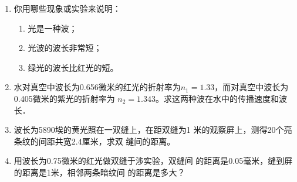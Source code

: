 \begin{enumerate}
    \item 你用哪些现象或实验来说明：
    \begin{enumerate}
        \item 光是一种波；
        \item 光波的波长非常短；
        \item 绿光的波长比红光的短。
    \end{enumerate}
    \item 水对真空中波长为0.656微米的红光的折射率为$n_1
    =1.33$，而对真空中波长为0.405微米的紫光的折射率为
    $n_2=1.343$。求这两种波在水中的传播速度和波长．
    \item 波长为5890埃的黄光照在一双缝上，在距双缝为1
    米的观察屏上，测得20个亮条纹的间距共宽2.4厘米，求双
    缝间的距离。
    \item 用波长为0.75微米的红光做双缝于涉实验，双缝间
    的距离是0.05毫米，缝到屏的距离是1米，相邻两条暗纹间
    的距离是多大？
\end{enumerate}








